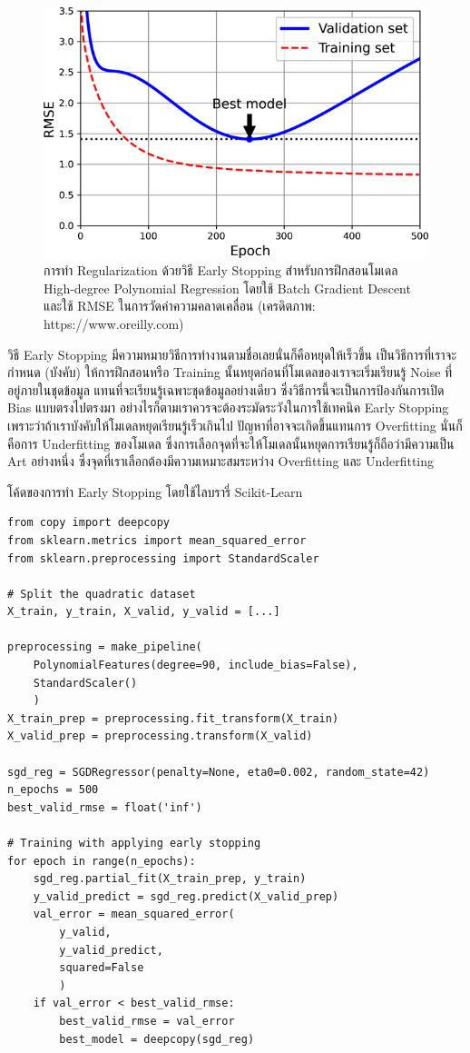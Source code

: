 \begin{figure}[H]
    \centering
    \includegraphics[width=0.9\linewidth]{fig/early_stopping.png}
    \caption{การทำ Regularization ด้วยวิธี Early Stopping สำหรับการฝึกสอนโมเดล High-degree Polynomial Regression 
    โดยใช้ Batch Gradient Descent และใช้ RMSE ในการวัดค่าความคลาดเคลื่อน (เครดิตภาพ: https://www.oreilly.com)}
    \label{fig:early_stopping}
\end{figure}

วิธี Early Stopping มีความหมายวิธีการทำงานตามชื่อเลยนั่นก็คือหยุดให้เร็วขึ้น เป็นวิธีการที่เราจะกำหนด (บังคับ) ให้การฝึกสอนหรือ Training 
นั้นหยุดก่อนที่โมเดลของเราจะเริ่มเรียนรู้ Noise ที่อยู่ภายในชุดข้อมูล แทนที่จะเรียนรู้เฉพาะชุดข้อมูลอย่างเดียว ซึ่งวิธีการนี้จะเป็นการป้องกันการเปิด 
Bias แบบตรงไปตรงมา อย่างไรก็ตามเราควรจะต้องระมัดระวังในการใช้เทคนิค Early Stopping เพราะว่าถ้าเราบังคับให้โมเดลหยุดเรียนรู้เร็วเกินไป
ปัญหาที่อาจจะเกิดขึ้นแทนการ Overfitting นั่นก็คือการ Underfitting ของโมเดล ซึ่งการเลือกจุดที่จะให้โมเดลนั้นหยุดการเรียนรู้ก็ถือว่ามีความเป็น Art อย่างหนึ่ง ซึ่งจุดที่เราเลือกต้องมีความเหมาะสมระหว่าง Overfitting และ Underfitting

\noindent โค้ดของการทำ Early Stopping โดยใช้ไลบรารี่ Scikit-Learn

\begin{lstlisting}[style=MyPython]
from copy import deepcopy
from sklearn.metrics import mean_squared_error
from sklearn.preprocessing import StandardScaler

# Split the quadratic dataset
X_train, y_train, X_valid, y_valid = [...]

preprocessing = make_pipeline(
    PolynomialFeatures(degree=90, include_bias=False),
    StandardScaler()
    )
X_train_prep = preprocessing.fit_transform(X_train)
X_valid_prep = preprocessing.transform(X_valid)

sgd_reg = SGDRegressor(penalty=None, eta0=0.002, random_state=42)
n_epochs = 500
best_valid_rmse = float('inf')

# Training with applying early stopping
for epoch in range(n_epochs):
    sgd_reg.partial_fit(X_train_prep, y_train)
    y_valid_predict = sgd_reg.predict(X_valid_prep)
    val_error = mean_squared_error(
        y_valid, 
        y_valid_predict, 
        squared=False
        )
    if val_error < best_valid_rmse:
        best_valid_rmse = val_error
        best_model = deepcopy(sgd_reg)
\end{lstlisting}

